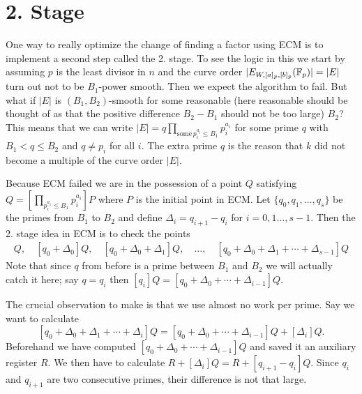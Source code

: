 \section{2. Stage} 
\label{sec:2StageECM}
One way to really optimize the change of finding a factor using ECM is to implement a second step called the 2. stage. To see the logic in this we start by assuming $p$ is the least divisor in $n$ and the curve order $\vert E_{W,[a]_p,[b]_p}(\mathbb{F}_p)\vert=\vert E\vert$ turn out not to be $B_1$-power smooth. Then we expect the algorithm to fail. But what if $\vert E\vert$ is $(B_1,B_2)$-smooth for some reasonable (here reasonable should be thought of as that the positive difference $B_2-B_1$ should not be too large) $B_2$? This means that we can write $\vert E\vert = q\prod_{\text{some}\,p_i^{a_i}\leq B_1}p_i^{a_i}$ for some prime $q$ with $B_1<q\leq B_2$ and $q\neq p_i$ for all $i$. The extra prime $q$ is the reason that $k$ did not become a multiple of the curve order $\vert E\vert$. 

Because ECM failed we are in the possession of a point $Q$ satisfying $Q=\left[ \prod_{p_i^{a_i}\leq B_1}p_i^{a_i}\right] P$ where $P$ is the initial point in ECM. Let $\{q_0,q_1,\ldots, q_s\}$ be the primes from $B_1$ to $B_2$ and define $\Delta_i=q_{i+1}-q_i$ for $i=0,1\ldots,s-1$. Then the 2. stage idea in ECM is to check the points
\begin{align}
[q_0]Q,\quad [q_0+\Delta_0]Q,\quad [q_0+\Delta_0+\Delta_1]Q,\quad \ldots,\quad \left[q_0+\Delta_0+\Delta_1+\cdots +\Delta_{s-1}\right]Q
\end{align}
Note that since $q$ from before is a prime between $B_1$ and $B_2$ we will actually catch it here; say $q=q_i$ then $[q_i]Q=[q_0+\Delta_0+\cdots+\Delta_{i-1}]Q$. 

The crucial observation to make is that we use almost no work per prime. Say we want to calculate 
\[
[q_0+\Delta_0+\Delta_1+\cdots+\Delta_i]Q=[q_0+\Delta_0+\cdots +\Delta_{i-1}]Q+[\Delta_i]Q.
\]
Beforehand we have computed $[q_0+\Delta_0+\cdots+\Delta_{i-1}]Q$ and saved it an auxiliary register $R$. We then have to calculate $R+[\Delta_i]Q=R+[q_{i+1}-q_i]Q$. Since $q_i$ and $q_{i+1}$ are two consecutive primes, their difference is not that large. 

